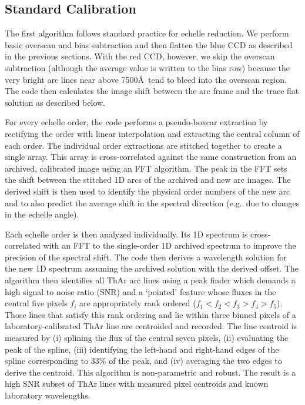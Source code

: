 \documentclass[]{emulateapj}
\begin{document}
\subsection{Standard Calibration}

The first algorithm follows standard practice for echelle reduction.
We perform basic overscan and bias subtraction and then flatten the
blue CCD as described in the previous sections.  With the red CCD,
however, we skip the overscan subtraction (although the average value
is written to the bias row) because the very bright arc lines near
above 7500\AA\ tend to bleed into the overscan region.  The code then
calculates the image shift between the arc frame and the trace flat
solution as described below.

For every echelle order, the code performs a pseudo-boxcar
extraction by rectifying the order with linear interpolation
and extracting the central column of each order.  
The individual order extractions are stitched together to 
create a single array.  This array
is cross-correlated against the same construction from 
an archived, calibrated image using an FFT algorithm.
The peak in the FFT sets the shift between the stitched 1D
arcs of the archived and new arc images. 
The derived shift is then used to identify the physical order
numbers of the new arc 
and to also predict the average shift in the spectral direction
(e.g.\ due to changes in the echelle angle). 

Each echelle order is then analyzed individually.  Its 1D spectrum
is cross-correlated with an FFT to the single-order 1D archived
spectrum to improve the precision of the spectral shift.
The code then derives a wavelength solution for the new 1D spectrum
assuming the archived solution with the derived offset.
The algorithm then identifies all ThAr arc lines using a peak
finder which demands a high signal to noise ratio (SNR) 
and a `pointed' feature whose
fluxes in the central five pixels $f_i$ are appropriately rank ordered
($f_1 < f_2 < f_3 > f_4 > f_5$).
Those lines that satisfy this rank ordering
and lie within three binned pixels of a laboratory-calibrated
ThAr line are centroided and recorded.
The line centroid is measured by (i) splining the flux of the
central seven pixels, (ii) evaluating the peak of the spline,
(iii) identifying the left-hand and right-hand edges of 
the spline corresponding to 33\% of the peak, and (iv) averaging
the two edges to derive the centroid.
This algorithm is non-parametric and robust.
The result is a
high SNR subset of ThAr lines with measured pixel centroids
and known laboratory wavelengths.  
\end{document}
